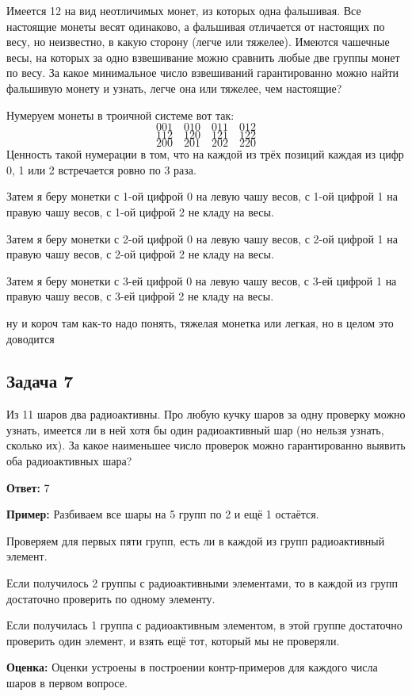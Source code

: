 Имеется 12 на вид неотличимых монет, из которых одна фальшивая. Все настоящие
монеты весят одинаково, а фальшивая отличается от настоящих по весу, но неизвестно, в какую сторону (легче или тяжелее). Имеются чашечные весы, на которых за одно
взвешивание можно сравнить любые две группы монет по весу. За какое минимальное число взвешиваний гарантированно можно найти фальшивую монету и узнать,
легче она или тяжелее, чем настоящие?

Нумеруем монеты в троичной системе вот так:
\[
001 \quad 010 \quad 011 \quad 012
\]
\[
112 \quad 120 \quad 121 \quad 122
\]
\[
200 \quad 201 \quad 202 \quad 220
\]
Ценность такой нумерации в том, что на каждой из трёх позиций каждая из цифр 0, 1 или 2 встречается ровно по 3 раза.

Затем я беру монетки с 1-ой цифрой 0 на левую чашу весов, с 1-ой цифрой 1 на правую чашу весов, с 1-ой цифрой 2 не кладу на весы.

Затем я беру монетки с 2-ой цифрой 0 на левую чашу весов, с 2-ой цифрой 1 на правую чашу весов, с 2-ой цифрой 2 не кладу на весы.

Затем я беру монетки с 3-ей цифрой 0 на левую чашу весов, с 3-ей цифрой 1 на правую чашу весов, с 3-ей цифрой 2 не кладу на весы.

ну и короч там как-то надо понять, тяжелая монетка или легкая, но в целом это доводится

\subsection{Задача 7}

Из 11 шаров два радиоактивны. Про любую кучку шаров за одну проверку можно
узнать, имеется ли в ней хотя бы один радиоактивный шар (но нельзя узнать, сколько
их). За какое наименьшее число проверок можно гарантированно выявить оба радиоактивных шара?

\textbf{Ответ:} 7

\textbf{Пример:} Разбиваем все шары на 5 групп по 2 и ещё 1 остаётся.

Проверяем для первых пяти групп, есть ли в каждой из групп радиоактивный элемент. 

Если получилось 2 группы с радиоактивными элементами, то в каждой из групп достаточно проверить по одному элементу.

Если получилась 1 группа с радиоактивным элементом, в этой группе достаточно проверить один элемент, и взять ещё тот, который мы не проверяли.

\textbf{Оценка:} Оценки устроены в построении контр-примеров для каждого числа шаров в первом вопросе.

